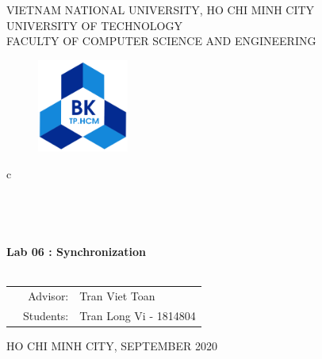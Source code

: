 \documentclass[13pt,a4paper]{article}
\begin{document}
	
	\begin{titlepage}
		\begin{center}
			VIETNAM NATIONAL UNIVERSITY, HO CHI MINH CITY \\
			UNIVERSITY OF TECHNOLOGY \\
			FACULTY OF COMPUTER SCIENCE AND ENGINEERING
		\end{center}
		
		\vspace{1cm}
		
		\begin{figure}[h!]
			\begin{center}
				\includegraphics[width=3cm]{hcmut.png}
			\end{center}
		\end{figure}
		
		\vspace{1cm}
		
		\begin{center}
			\color{blue}
			\begin{tabular}{c}
				\\
				~~\\
				\hline
				\\
				\\
				\\
				\textbf{{\Huge Lab 06 : Synchronization}}\\
				\\
				\hline
			\end{tabular}
			\color{blue}
		\end{center}
		\vspace{1cm}
		
		\begin{table}[h]
			\color{blue}
			\begin{tabular}{rrl}
				\hspace{5 cm} & Advisor: & Tran Viet Toan\\
				& Students: & Tran Long Vi - 1814804 \\
			\end{tabular}
			\color{blue}
		\end{table}
		
		\vspace{4 cm}
		\begin{center}
			{\footnotesize\large HO CHI MINH CITY, SEPTEMBER 2020}
		\end{center}
	\end{titlepage}
	
\end{document}
